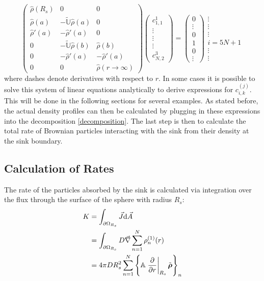\begin{equation}
    \left( \begin{array}{ccc}
        \hat{\rho}(R_s) & 0 & 0 \\
        \hat{\rho}(a)   & -\tilde{\mathbb{U}}\hat{\rho}(a) & 0 \\
        \hat{\rho}'(a) & -\hat{\rho}'(a) & 0 \\
        0 &  -\tilde{\mathbb{U}}\hat{\rho}(b) & \hat{\rho}(b) \\
        0 &  -\hat{\rho}'(a) & - \hat{\rho}'(a) \\
        0 & 0 & \hat{\rho}(r\rightarrow \infty)
    \end{array}\right) \left( \begin{array}{c} c_{1,1}^{1} \\ \vdots \\ \vdots \\ \vdots \\ c_{N,2}^{3} \end{array} \right) = 
    \left( \begin{array}{c} 0 \\ \vdots \\ 0 \\ 1 \\ 0 \\ \vdots \end{array} \right) \begin{array}{c} \vdots \\ \vdots \\ \vdots \\ i = 5N+1 \\ \vdots \\ \vdots \end{array}
    \label{lgs}
\end{equation}
where dashes denote derivatives with respect to $r$. In some cases it is possible to solve this system of linear equations analytically to derive expressions for $c_{i,k}^{(j)}$. \\ 
This will be done in the following sections for several examples. As stated before, the actual density profiles can then be calculated by plugging in these expressions into the decomposition \eqref{decomposition}. The last step is then to calculate the total rate of Brownian particles interacting with the sink from their density at the sink boundary.
\subsection{Calculation of Rates}
\label{Calculation_of_Rates}
The rate of the particles absorbed by the sink is calculated via integration over the flux through the surface of the sphere with radius $R_s$:
\begin{align}
    K   &= \int_{\partial \Omega_{R_s}} \vec{J} {\rm d} \vec{A}\nonumber\\
    &= \int_{\partial \Omega_{R_s}} D \vec{\nabla} \sum_{n=1}^{N} \rho_n^{(1)}(r)\nonumber \\
    &= 4 \pi D R_s^{2} \sum_{n=1}^{N} \left\{ \mathbb{A} \left. \frac{\partial}{ \partial r}\right|_{R_s} \tilde{\boldsymbol{\mathbf{\rho}}} \right\}_n
    \label{Rate}
\end{align}

